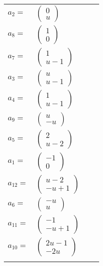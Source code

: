 \documentclass[1p]{elsarticle_modified}
\theoremstyle{definition}
\begin{document}
\begin{tabular}{m{7pt} m{180pt} m{7pt} m{180pt} }
\flushright $a_{2}=$&$\begin{pmatrix}0\\u\end{pmatrix}$ \\
\flushright $a_{8}=$&$\begin{pmatrix}1\\0\end{pmatrix}$ \\
\flushright $a_{7}=$&$\begin{pmatrix}1\\u-1\end{pmatrix}$ \\
\flushright $a_{3}=$&$\begin{pmatrix}u\\u-1\end{pmatrix}$ \\
\flushright $a_{4}=$&$\begin{pmatrix}1\\u-1\end{pmatrix}$ \\
\flushright $a_{9}=$&$\begin{pmatrix}u\\- u\end{pmatrix}$ \\
\flushright $a_{5}=$&$\begin{pmatrix}2\\u-2\end{pmatrix}$ \\
\flushright $a_{1}=$&$\begin{pmatrix}-1\\0\end{pmatrix}$ \\
\flushright $a_{12}=$&$\begin{pmatrix}u-2\\- u+1\end{pmatrix}$ \\
\flushright $a_{6}=$&$\begin{pmatrix}- u\\u\end{pmatrix}$ \\
\flushright $a_{11}=$&$\begin{pmatrix}-1\\- u+1\end{pmatrix}$ \\
\flushright $a_{10}=$&$\begin{pmatrix}2 u-1\\-2 u\end{pmatrix}$\\&\end{tabular}
\end{document}
